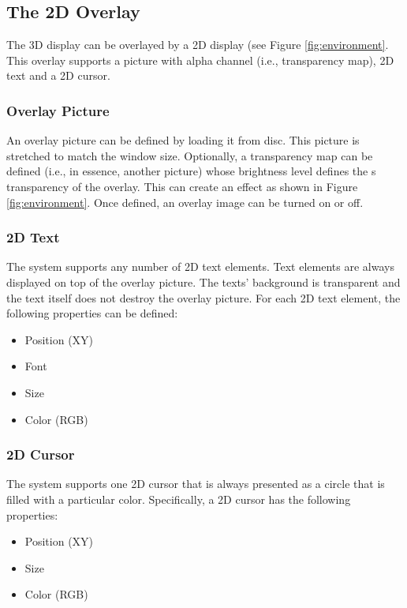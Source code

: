 \documentclass[letterpaper,oneside,12pt]{article}
\begin{document}
\subsection{The 2D Overlay}

The 3D display can be overlayed by a 2D display (see Figure 
\ref{fig:environment}. This overlay supports a picture with alpha channel (i.e., 
transparency map), 2D text and a 2D cursor.

\subsubsection{Overlay Picture}

An overlay picture can be defined by loading it from disc. This picture is 
stretched to match the window size. Optionally, a transparency map can be 
defined (i.e., in essence, another picture) whose brightness level defines the s
transparency of the overlay. This can create an effect as shown in Figure 
\ref{fig:environment}. Once defined, an overlay image can be turned on or off.

\subsubsection{2D Text}

The system supports any number of 2D text elements. Text elements are always 
displayed on top of the overlay picture. The texts' background is transparent 
and the text itself does not destroy the overlay picture. For each 2D text 
element, the following properties can be defined:

\begin{itemize}
 \item Position (XY)
 \item Font
 \item Size
 \item Color (RGB)
\end{itemize}


\subsubsection{2D Cursor}

The system supports one 2D cursor that is always presented as a circle
that is filled with a particular color. Specifically, a 2D cursor has
the following properties:

\begin{itemize}
 \item Position (XY)
 \item Size
 \item Color (RGB)
\end{itemize}


\end{document}
